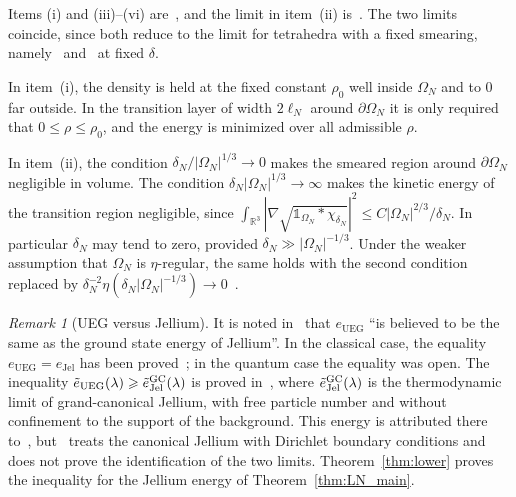 \documentclass[final,reqno]{amsart}
\theoremstyle{remark}
\newtheorem{remark}{Remark}
\theoremstyle{definition}
\renewcommand{\le}{\leqslant}
\renewcommand{\ge}{\geqslant}
\newcommand{\RR}{\mathbb{R}}
\newcommand{\iden}{\mathbb{1}}
\newcommand{\UEG}{\mathrm{UEG}}
\newcommand{\Jel}{\mathrm{Jel}}
\begin{document}
Items (i) and (iii)--(vi) are~\cite[Thm.~5.1]{lewin2018statistical}, and the limit in item~(ii) is~\cite[Thm.~1]{lewin2020local}. The two limits coincide, since both reduce to the limit for tetrahedra with a fixed smearing, namely~\cite[Rem.~5.2 and Lemma~5.6]{lewin2018statistical} and~\cite[Prop.~17]{lewin2020local} at fixed $\delta$.

In item~(i), the density is held at the fixed constant $\rho_0$ well inside $\Omega_N$ and to $0$ far outside. In the transition layer of width $2\ell_N$ around $\partial\Omega_N$ it is only required that $0\le\rho\le\rho_0$, and the energy is minimized over all admissible $\rho$.

In item~(ii), the condition $\delta_N/|\Omega_N|^{1/3}\to0$ makes the smeared region around $\partial\Omega_N$ negligible in volume. The condition $\delta_N|\Omega_N|^{1/3}\to\infty$ makes the kinetic energy of the transition region negligible, since $\int_{\RR^3}|\nabla\sqrt{\iden_{\Omega_N}\ast\chi_{\delta_N}}|^2\le C|\Omega_N|^{2/3}/\delta_N$. In particular $\delta_N$ may tend to zero, provided $\delta_N\gg|\Omega_N|^{-1/3}$. Under the weaker assumption that $\Omega_N$ is $\eta$-regular, the same holds with the second condition replaced by $\delta_N^{-2}\eta(\delta_N|\Omega_N|^{-1/3})\to0$~\cite[Rem.~2]{lewin2020local}.

\begin{remark}[UEG versus Jellium]\label{rem:UEG_vs_Jel}
It is noted in~\cite[Sec.~2.2]{lewin2020local} that $e_\UEG$ ``is believed to be the same as the ground state energy of Jellium''. In the classical case, the equality $e_\UEG=e_\Jel$ has been proved~\cite{lewin2019floating,cotar2017equality}; in the quantum case the equality was open. The inequality $\tilde e_\UEG(\lambda)\ge\tilde e^{\rm GC}_\Jel(\lambda)$ is proved in~\cite[proof of Thm.~5.1, Step~4]{lewin2018statistical}, where $\tilde e^{\rm GC}_\Jel(\lambda)$ is the thermodynamic limit of grand-canonical Jellium, with free particle number and without confinement to the support of the background. This energy is attributed there to~\cite{lieb1975thermodynamic}, but~\cite{lieb1975thermodynamic} treats the canonical Jellium with Dirichlet boundary conditions and does not prove the identification of the two limits. Theorem~\ref{thm:lower} proves the inequality for the Jellium energy of Theorem~\ref{thm:LN_main}.
\end{remark}



\end{document}
